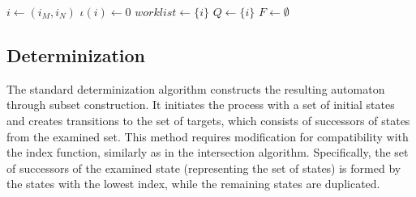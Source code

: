 \documentclass[pdflatex,sn-mathphys-num]{sn-jnl}%
\theoremstyle{thmstyleone}%
\theoremstyle{thmstyletwo}%
\theoremstyle{thmstylethree}%
\begin{document}
\begin{algorithm}
            \vspace*{0.5em}

            $i \leftarrow (i_M, i_N)$\;
            $\iota(i) \leftarrow 0$\;
            $worklist \leftarrow \{i\}$\;
            $Q \leftarrow \{i\}$\;
            $F \leftarrow \emptyset$\;
            \;
            \normalsize
        \end{algorithm}

        \vspace*{-1em}

    \subsection{Determinization}
        The standard determinization algorithm constructs the resulting automaton through subset construction. It initiates the process with a set of initial states and creates transitions to the set of targets, which consists of successors of states from the examined set. This method requires modification for compatibility with the index function, similarly as in the intersection algorithm. Specifically, the set of successors of the examined state (representing the set of states) is formed by the states with the lowest index, while the remaining states are duplicated.

        \vspace*{-0.5em}
\end{document}
